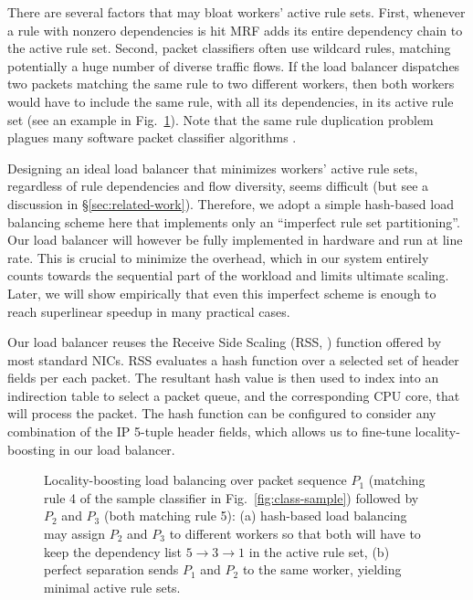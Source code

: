 There are several factors that may bloat workers' active rule sets. First, whenever a rule with nonzero dependencies is hit MRF adds its entire dependency chain to the active rule set. Second, packet classifiers often use wildcard rules, matching potentially a huge number of diverse traffic flows. If the load balancer dispatches two packets matching the same rule to two different workers, then both workers would have to include the same rule, with all its dependencies, in its active rule set (see an example in Fig.~\ref{fig:active-set-lb}). Note that the same rule duplication problem plagues many software packet classifier algorithms \cite{10.1145/863955.863980, 820051, 10.1145/1851182.1851208, 8485947}.

Designing an ideal load balancer that minimizes workers' active rule sets, regardless of rule dependencies and flow diversity, seems difficult (but see a discussion in \S\ref{sec:related-work}). Therefore, we adopt a simple hash-based load balancing scheme here that implements only an ``imperfect rule set partitioning''. Our load balancer will however be fully implemented in hardware and run at line rate. This is crucial to minimize the overhead, which in our system entirely counts towards the sequential part of the workload and limits ultimate scaling.  Later, we will show empirically that even this imperfect scheme is enough to reach superlinear speedup in many practical cases.

Our load balancer reuses the Receive Side Scaling (RSS, \cite{10.1145/3359989.3365412, rss-linux}) function offered by most standard NICs. RSS evaluates a hash function over a selected set of header fields per each packet. The resultant hash value is then used to index into an indirection table to select a packet queue, and the corresponding CPU core, that will process the packet. The hash function can be configured to consider any combination of the IP 5-tuple header fields, which allows us to fine-tune locality-boosting in our load balancer.

\begin{figure}[t]
  \centering
  \caption{Locality-boosting load balancing over packet sequence $P_1$ (matching rule 4 of the sample classifier in Fig.~\ref{fig:class-sample}) followed by $P_2$ and $P_3$ (both matching rule 5): (a) hash-based load balancing may assign $P_2$ and $P_3$ to different workers so that both will have to keep the dependency list $5\to 3\to 1$ in the active rule set, (b) perfect separation sends $P_1$ and $P_2$ to the same worker, yielding minimal active rule sets.}
  \label{fig:active-set-lb}
\end{figure}

